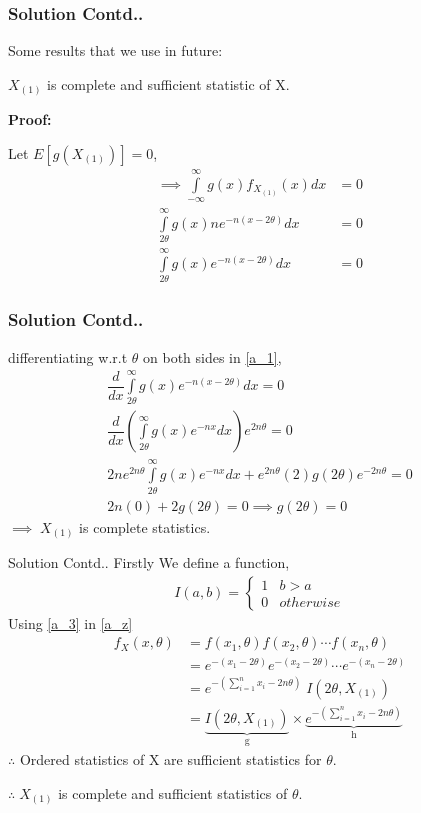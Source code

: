 \documentclass{beamer}
\providecommand{\brak}[1]{\ensuremath{\left(#1\right)}}
\begin{document}
\begin{frame}
\frametitle{Solution Contd..}
Some results that we use in future:

  $X_{(1)} $ is complete and sufficient statistic of X.
    
    \textbf{Proof:} 

    Let $E[g(X_{(1)})]=0$,
    \begin{align}
        \implies\int\limits_{-\infty}^{\infty} g(x) f_{X_{(1)}}(x) dx&=0\\
        \int\limits_{2\theta}^{\infty} g(x) n e^{-n(x-2\theta)} dx &=0\\
        \int\limits_{2\theta}^{\infty} g(x) e^{-n(x-2\theta)} dx &=0\label{a_1}
    \end{align}
\end{frame}

\begin{frame}
\frametitle{Solution Contd..}
differentiating w.r.t $\theta$ on both sides in \eqref{a_1},
    \begin{align}
      \nonumber  \dfrac{d}{dx} \int\limits_{2\theta}^{\infty} g(x) e^{-n(x-2\theta)} dx =0\\
     \nonumber   \dfrac{d}{dx} \brak{\int\limits_{2\theta}^{\infty} g(x) e^{-nx} dx} e^{2n\theta} =0\\
     \nonumber   2n e^{2n\theta}\int\limits_{2\theta}^{\infty} g(x) e^{-nx} dx+e^{2n\theta}(2)g(2\theta)e^{-2n\theta}=0\\
     \nonumber2n(0)+2g(2\theta)=0\implies g(2\theta)=0
    \end{align}
    $\implies\;X_{(1)}$ is complete statistics.
\end{frame}

\begin{frame}{Solution Contd..}
    Firstly We define a function,
    \begin{align}
        I{\brak{a,b}}=
        \begin{cases}
        1 & b>a
        \\
        0 & otherwise\label{a_3}
        \end{cases}
    \end{align}
    Using \eqref{a_3} in \eqref{a_z}
    \begin{align}
        f_X(x,\theta)&=f(x_1,\theta)f(x_2,\theta)\cdots f(x_n,\theta)\\
        &=e^{-(x_1-2\theta)}e^{-(x_2-2\theta)}\cdots e^{-(x_n-2\theta)}\\
        &=e^{-\brak{\sum\limits_{i=1}^n x_i-2n\theta}}\;{I({2\theta,X_{(1)}})}\label{a_z}\\
        &=\underbrace{I\brak{2\theta,X_{(1)}} }_\text{g}\times\underbrace{e^{-\brak{\sum\limits_{i=1}^n x_i-2n\theta}}}_\text{h}
    \end{align}
     $\therefore$ Ordered statistics of X are sufficient statistics for $\theta$.
    
    $\therefore\;X_{(1)}$ is complete and sufficient statistics of $\theta$. 
\end{frame}
\end{document}
